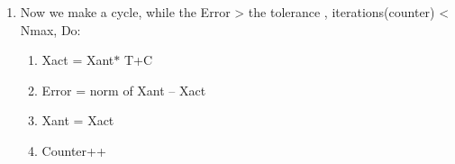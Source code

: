 \documentclass[12pt]{article}
\renewcommand{\_}{\kern-1.5pt\textunderscore\kern-1.5pt}
\begin{document}
\begin{enumerate}
	\item Now we make a cycle, while the Error > the tolerance , iterations(counter) < Nmax, Do:\par

\begin{enumerate}
	\item Xact = Xant$\ast$ T+C\par

	\item Error = norm of Xant – Xact\par

	\item Xant = Xact\par

	\item Counter++ 
\end{enumerate}
\end{enumerate}\par


\vspace{\baselineskip}

\printbibliography
\end{document}
